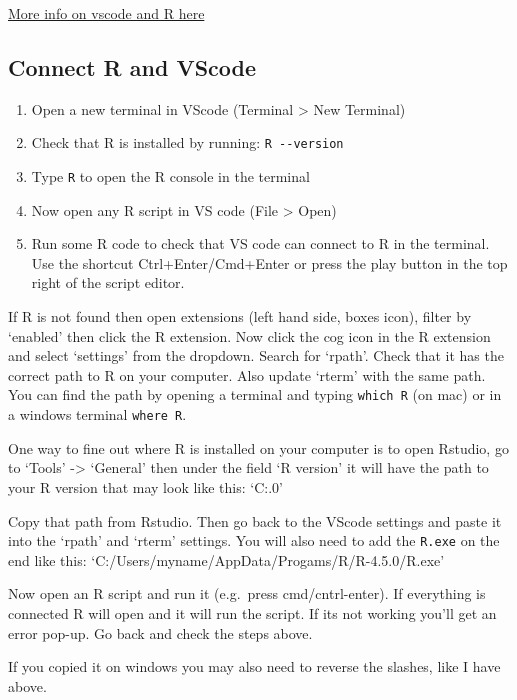 \documentclass[
  letterpaper,
  DIV=11,
  numbers=noendperiod]{scrreprt}
\providecommand{\tightlist}{%
  \setlength{\itemsep}{0pt}\setlength{\parskip}{0pt}}
\begin{document}
\href{https://code.visualstudio.com/docs/languages/r}{More info on
vscode and R here}

\subsection{Connect R and VScode}\label{connect-r-and-vscode}

\begin{enumerate}
\def\labelenumi{\arabic{enumi}.}
\tightlist
\item
  Open a new terminal in VScode (Terminal \textgreater{} New Terminal)
\item
  Check that R is installed by running: \texttt{R\ -\/-version}
\item
  Type \texttt{R} to open the R console in the terminal
\item
  Now open any R script in VS code (File \textgreater{} Open)
\item
  Run some R code to check that VS code can connect to R in the
  terminal. Use the shortcut Ctrl+Enter/Cmd+Enter or press the play
  button in the top right of the script editor.
\end{enumerate}

If R is not found then open extensions (left hand side, boxes icon),
filter by `enabled' then click the R extension. Now click the cog icon
in the R extension and select `settings' from the dropdown. Search for
`rpath'. Check that it has the correct path to R on your computer. Also
update `rterm' with the same path. You can find the path by opening a
terminal and typing \texttt{which\ R} (on mac) or in a windows terminal
\texttt{where\ R}.

One way to fine out where R is installed on your computer is to open
Rstudio, go to `Tools' -\textgreater{} `General' then under the field `R
version' it will have the path to your R version that may look like
this: `C:\Users\myname\AppData\Progams\R{}.0'

Copy that path from Rstudio. Then go back to the VScode settings and
paste it into the `rpath' and `rterm' settings. You will also need to
add the \texttt{R.exe} on the end like this:
`C:/Users/myname/AppData/Progams/R/R-4.5.0/R.exe'

Now open an R script and run it (e.g.~press cmd/cntrl-enter). If
everything is connected R will open and it will run the script. If its
not working you'll get an error pop-up. Go back and check the steps
above.

If you copied it on windows you may also need to reverse the slashes,
like I have above.
\end{document}
